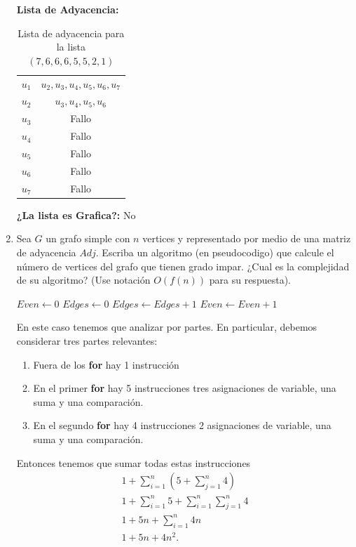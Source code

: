 \documentclass[12pt]{exam}
\begin{document}
\begin{enumerate}
  \textbf{Lista de Adyacencia:}
  \begin{table}[H]
    \centering
    \caption{Lista de adyacencia para la lista $\left( 7,6,6,6,5,5,2,1 \right) $}
    \label{tab:listaadj}
    \begin{tabular}{|c|c|}
      \hline
     $u_1$& $u_2,u_3,u_4,u_5,u_6,u_7$ \\
     $u_2$ & $u_3, u_4, u_5, u_6$\\
     $u_3$ & Fallo \\
     $u_4$ & Fallo \\
     $u_5$ & Fallo \\
     $u_6$ & Fallo \\
     $u_7$ & Fallo \\
     \hline
    \end{tabular}
  \end{table}

  \textbf{¿La lista es Grafica?: } No

\item Sea $G$ un grafo simple con $n$ vertices y representado por medio de una matriz de adyacencia $Adj$. Escriba un algoritmo (en pseudocodigo) que calcule el número de vertices del grafo que tienen grado impar. ¿Cual es la complejidad de su algoritmo? (Use notación $O\left( f\left( n \right)  \right) $ para su respuesta).

  
  \begin{algorithmic}[1]
    \State $Even \gets 0$
    \State $Edges \gets 0$
    \State $Edges \gets Edges + 1$
    \EndIf
    \EndFor
    \State  $Even \gets Even+1$
    \EndIf
    \EndFor
    \EndProcedure
  \end{algorithmic}

  En este caso tenemos que analizar por partes. En particular, debemos considerar tres partes relevantes:
  \begin{enumerate}
    \item Fuera de los \textbf{for} hay 1 instrucción
    \item En el primer \textbf{for} hay 5 instrucciones tres asignaciones de variable, una suma y una comparación.
    \item En el segundo \textbf{for} hay 4 instrucciones 2 asignaciones de variable, una suma y una comparación.
  \end{enumerate}

  Entonces tenemos que sumar todas estas instrucciones
  \begin{align*}
    1 + \sum_{i=1}^{n} \left(5 + \sum_{j=1}^{n} 4\right)\\
    1 + \sum_{i=1}^{n} 5 + \sum_{i=1}^{n} \sum_{j=1}^{n} 4\\
    1 + 5n + \sum_{i=1}^{n} 4n\\
    1 + 5n + 4n^2
  .\end{align*}
  

\end{enumerate}
\end{document}
